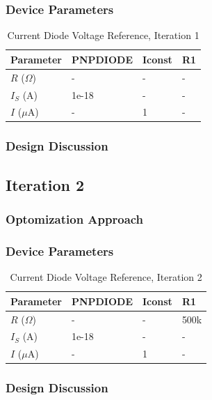 \documentclass[conference]{IEEEtran}
\begin{document}
	\subsubsection{Device Parameters}
\begin{table}[!htbp]
  \caption[]{Current Diode Voltage Reference, Iteration 1}
  \label{tab:cm-dp-1}
  \centering
  \begin{tabular}{|l|l|l|l|}
    \hline
    Parameter			& PNPDIODE	&Iconst	&R1	\\ \hline
    $R$ ($\Omega$)		&-			&-	&- 	\\ \hline
    $I_S$ (A)		&1e-18			&-	&-	\\ \hline
    $I$ ($\mu$A)	&-				&1	&-	\\
    \hline
  \end{tabular}
\end{table}
\subsubsection{Design Discussion}

\subsection{Iteration 2}
\subsubsection{Optomization Approach}
	\subsubsection{Device Parameters}
\begin{table}[!htbp]
  \caption[]{Current Diode Voltage Reference, Iteration 2}
  \label{tab:cm-dp-2}
  \centering
  \begin{tabular}{|l|l|l|l|}
    \hline
    Parameter			& PNPDIODE	&Iconst	&R1	\\ \hline
    $R$ ($\Omega$)		&-			&-	&500k 	\\ \hline
    $I_S$ (A)		&1e-18			&-	&-	\\ \hline
    $I$ ($\mu$A)	&-				&1	&-	\\
    \hline
  \end{tabular}
\end{table}
\subsubsection{Design Discussion}
\end{document}
